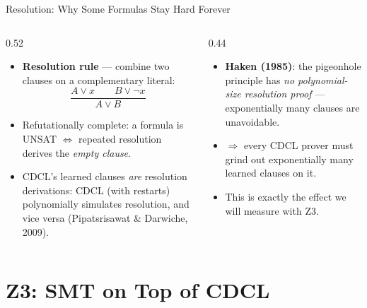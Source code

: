 \documentclass[10pt,aspectratio=169,xcolor={table}]{beamer}
\begin{document}
\begin{frame}{Resolution: Why Some Formulas Stay Hard Forever}
  \begin{columns}[T]
    \begin{column}{0.52\textwidth}
      \begin{itemize}\itemsep3pt
        \item \textbf{Resolution rule} --- combine two clauses on a
          complementary literal:
          \[
            \frac{A \lor x \qquad B \lor \lnot x}{A \lor B}
          \]
        \item Refutationally complete: a formula is UNSAT
          $\iff$ repeated resolution derives the \emph{empty
          clause}.
        \item CDCL's learned clauses \emph{are} resolution
          derivations: CDCL (with restarts) polynomially simulates
          resolution, and vice versa (Pipatsrisawat \& Darwiche,
          2009).
      \end{itemize}
    \end{column}
    \begin{column}{0.44\textwidth}
      \begin{itemize}\itemsep3pt
        \item \textbf{Haken (1985)}: the pigeonhole principle has
          \emph{no polynomial-size resolution proof} ---
          exponentially many clauses are unavoidable.
        \item $\Rightarrow$ every CDCL prover must grind out
          exponentially many learned clauses on it.
        \item \alert{This is exactly the effect we will measure
          with Z3.}
      \end{itemize}
    \end{column}
  \end{columns}
\end{frame}

\section{Z3: SMT on Top of CDCL}
\end{document}
